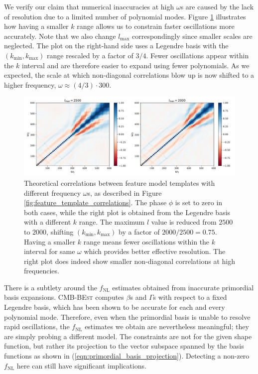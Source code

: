 We verify our claim that numerical inaccuracies at high $\omega$s are caused by the lack of resolution due to a limited number of polynomial modes. Figure \ref{fig:feature_template_correlations_compare_lmax} illustrates how having a smaller $k$ range allows us to constrain faster oscillations more accurately. Note that we also change $l_\text{max}$ correspondingly since smaller scales are neglected. The plot on the right-hand side uses a Legendre basis with the $(k_\text{min}, k_\text{max})$ range rescaled by a factor of $3/4$. Fewer oscillations appear within the $k$ interval and are therefore easier to expand using fewer polynomials. As we expected, the scale at which non-diagonal correlations blow up is now shifted to a higher frequency, $\omega \approx (4/3) \cdot 300$. 

\begin{figure}[htbp!] 
	\centering    
	\includegraphics[width=\textwidth]{sine_template_correlations_compare_lmax_new.pdf}
	\caption{Theoretical correlations between feature model templates with different frequency $\omega$s, as described in Figure \ref{fig:feature_template_correlations}. The phase $\phi$ is set to zero in both cases, while the right plot is obtained from the Legendre basis with a different $k$ range. The maximum $l$ value is reduced from $2500$ to $2000$, shifting $(k_\text{min},k_\text{max})$ by a factor of $2000/2500 = 0.75$. Having a smaller $k$ range means fewer oscillations within the $k$ interval for same $\omega$ which provides better effective resolution. The right plot does indeed show smaller non-diagonal correlations at high frequencies.}
	\label{fig:feature_template_correlations_compare_lmax}
\end{figure}

There is a subtlety around the $f_\text{NL}$ estimates obtained from inaccurate primordial basis expansions. \textsc{CMB-BEst} computes $\beta$s and $\Gamma$s with respect to a fixed Legendre basis, which has been shown to be accurate for each and every polynomial mode. Therefore, even when the primordial basis is unable to resolve rapid oscillations, the $f_\text{NL}$ estimates we obtain are nevertheless meaningful; they are simply probing a different model. The constraints are not for the given shape function, but rather its projection to the vector subspace spanned by the basis functions as shown in (\ref{eqn:primordial_basis_projection}). Detecting a non-zero $f_\text{NL}$ here can still have significant implications.

